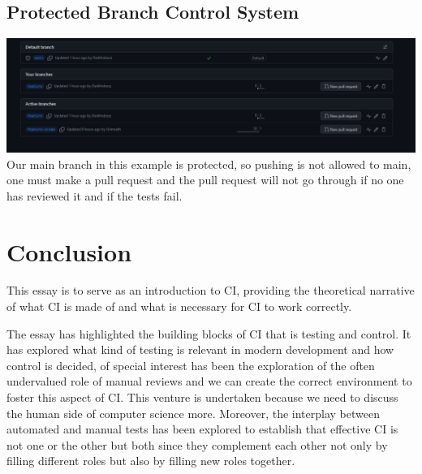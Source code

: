\documentclass{article}
\begin{document}
\subsection{Protected Branch Control System}
\includegraphics[width=\linewidth]{Screenshot 2023-11-29 161625.png}
Our main branch in this example is protected, so pushing is not allowed to main, one must make a pull request and
the pull request will not go through if no one has reviewed it and if the tests fail.

\section{Conclusion}

This essay is to serve as an introduction to CI, providing the theoretical narrative of
what CI is made of and what is necessary for CI to work correctly.

The essay has highlighted the building blocks of CI that is testing and control. It has explored what
kind of testing is relevant in modern development and how control is decided, of special interest has been the exploration of
the often undervalued role of manual reviews and we can create the correct environment to foster this aspect of CI. This venture is
undertaken because we need to discuss the human side of computer science more. \cite{senthil_behind_2023}
Moreover, the interplay between automated and manual tests has been explored to establish that effective CI is not one or the other
but both since they complement each other not only by filling different roles but also by filling new roles together. 
\newpage
\printbibliography
\end{document}
